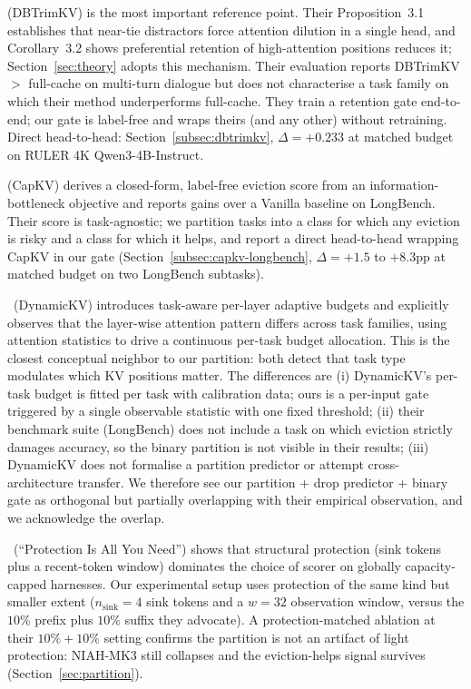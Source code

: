 \documentclass{article}
\begin{document}
\citet{arxiv260509649} (DBTrimKV) is the most important reference point.
Their Proposition~3.1 establishes that near-tie distractors force attention
dilution in a single head, and Corollary~3.2 shows preferential retention of
high-attention positions reduces it; Section~\ref{sec:theory} adopts this
mechanism. Their evaluation reports DBTrimKV $>$ full-cache on multi-turn
dialogue but does not characterise a task family on which their method
underperforms full-cache. They train a retention gate end-to-end; our gate is
label-free and wraps theirs (and any other) without retraining. Direct
head-to-head: Section~\ref{subsec:dbtrimkv}, $\Delta = +0.233$ at matched
budget on RULER 4K Qwen3-4B-Instruct.

\citet{arxiv260425975}
(CapKV) derives a closed-form, label-free eviction score from an
information-bottleneck objective and reports gains over a Vanilla baseline on
LongBench. Their score is task-agnostic; we partition tasks into a class for
which any eviction is risky and a class for which it helps, and report a
direct head-to-head wrapping CapKV in our gate
(Section~\ref{subsec:capkv-longbench}, $\Delta = +1.5$ to $+8.3$pp at
matched budget on two LongBench subtasks).

\citet{arxiv241214838}~(DynamicKV) introduces task-aware per-layer adaptive
budgets and explicitly observes that the layer-wise attention pattern
differs across task families, using attention statistics to drive a
continuous per-task budget allocation. This is the closest conceptual
neighbor to our partition: both detect that task type modulates which KV
positions matter. The differences are (i) DynamicKV's per-task budget is
fitted per task with calibration data; ours is a per-input gate triggered
by a single observable statistic with one fixed threshold; (ii) their
benchmark suite (LongBench) does not include a task on which eviction
strictly damages accuracy, so the binary partition is not visible in their
results; (iii) DynamicKV does not formalise a partition predictor or
attempt cross-architecture transfer. We therefore see our partition + drop
predictor + binary gate as orthogonal but partially overlapping with their
empirical observation, and we acknowledge the overlap.

\citet{arxiv260518053}~(``Protection Is All You Need'')
shows that structural protection (sink tokens plus a recent-token window)
dominates the choice of scorer on globally capacity-capped harnesses. Our
experimental setup uses protection of the same kind but smaller extent
($n_{\text{sink}} = 4$ sink tokens and a $w = 32$ observation window, versus
the $10\%$ prefix plus $10\%$ suffix they advocate). A protection-matched
ablation at their $10\% + 10\%$ setting confirms the partition is not an
artifact of light protection: NIAH-MK3 still collapses and the
eviction-helps signal survives (Section~\ref{sec:partition}).
\end{document}
